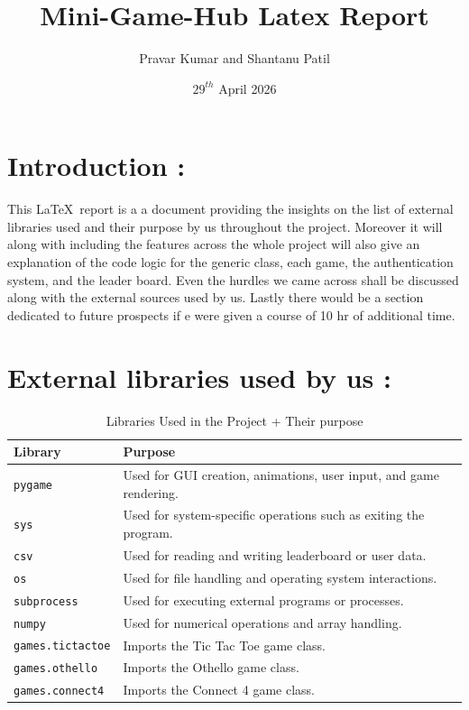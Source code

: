 \documentclass{article}
\title{Mini-Game-Hub Latex Report}
\author{Pravar Kumar and Shantanu Patil}
\date{${29^{th}}$ April 2026}
\begin{document}
\maketitle

\section*{Introduction :}
This \LaTeX\ report is a a document providing the insights on the  list of external libraries used and their purpose by us throughout the project. Moreover it will along with including the features across the whole project will also give  an explanation of the code logic for the generic class, each game, the authentication
system, and the leader board. Even the hurdles we came across shall be discussed along with the external sources used by us. Lastly there would be a section dedicated to future prospects if e were given a course of 10 hr of additional time.

\section*{External libraries used by us :}

\begin{table}[h]
\centering
\begin{tabular}{|l|p{9cm}|}
\hline
\textbf{Library} & \textbf{Purpose} \\ 
\hline
\texttt{pygame} & Used for GUI creation, animations, user input, and game rendering. \\ 
\hline
\texttt{sys} & Used for system-specific operations such as exiting the program. \\ 
\hline
\texttt{csv} & Used for reading and writing leaderboard or user data. \\ 
\hline
\texttt{os} & Used for file handling and operating system interactions. \\ 
\hline
\texttt{subprocess} & Used for executing external programs or processes. \\ 
\hline
\texttt{numpy} & Used for numerical operations and array handling. \\ 
\hline
\texttt{games.tictactoe} & Imports the Tic Tac Toe game class. \\ 
\hline
\texttt{games.othello} & Imports the Othello game class. \\ 
\hline
\texttt{games.connect4} & Imports the Connect 4 game class. \\ 
\hline
\end{tabular}
\caption{Libraries Used in the Project + Their purpose}
\end{table}
\end{document}
